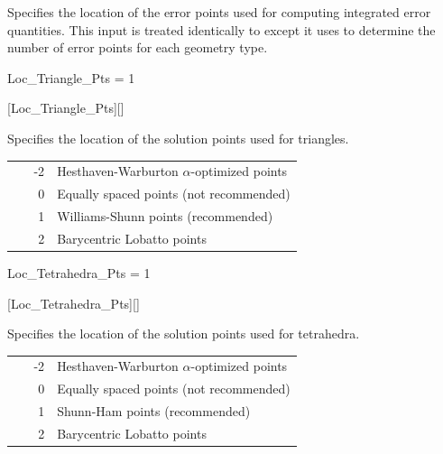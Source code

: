 \begin{nmldescbody}
Specifies the location of the error points used for computing integrated
error quantities. This input is treated identically to
 except it uses
to determine the number of error points for each geometry type.
\end{nmldescbody}


\begin{nmldescitem}
Loc_Triangle_Pts = 1
\end{nmldescitem}
[Loc\_Triangle\_Pts][]

\begin{nmldescbody}
Specifies the location of the solution points used for triangles.
\\
\begin{tabular}{ @{\qquad} r @{ = } p{0.85\linewidth} @{} }
  -2 & Hesthaven-Warburton $\alpha$-optimized points\cite{Hesthaven_2010} \\
   0 & Equally spaced points (not recommended) \\
   1 & Williams-Shunn points\cite{Williams_2013} (recommended) \\
   2 & Barycentric Lobatto points
\end{tabular}
\end{nmldescbody}


\FINALFIX{\newpage}
\begin{nmldescitem}
Loc_Tetrahedra_Pts = 1
\end{nmldescitem}
[Loc\_Tetrahedra\_Pts][]

\begin{nmldescbody}
Specifies the location of the solution points used for tetrahedra.
\\
\begin{tabular}{ @{\qquad} r @{ = } p{0.85\linewidth} @{} }
  -2 & Hesthaven-Warburton $\alpha$-optimized points\cite{Hesthaven_2010} \\
   0 & Equally spaced points (not recommended)\\
   1 & Shunn-Ham points\cite{Shunn_2012} (recommended) \\
   2 & Barycentric Lobatto points \\
\end{tabular}
\end{nmldescbody}

